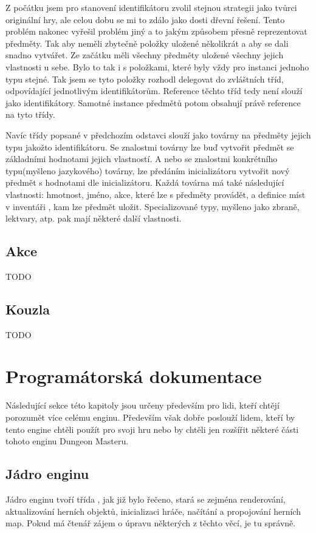Z počátku jsem pro stanovení identifikátoru zvolil stejnou strategii jako tvůrci originální hry, ale celou dobu se mi 
to zdálo jako dosti dřevní řešení. Tento problém nakonec vyřešil problém jiný a to jakým způsobem přesně reprezentovat předměty. Tak aby neměli zbytečně
položky uložené několikrát a aby se dali snadno vytvářet. Ze začátku měli všechny předměty uložené 
všechny jejich vlastnosti u sebe. Bylo to tak i s položkami, které byly vždy pro instanci jednoho typu stejné. Tak jsem se
tyto položky rozhodl delegovat do zvláštních tříd, odpovídající jednotlivým identifikátorům. Reference těchto tříd
tedy není slouží jako identifikátory. Samotné instance předmětů potom obsahují právě reference na tyto třídy.

Navíc třídy popsané v předchozím odstavci slouží jako továrny na předměty jejich typu jakožto identifikátoru. Se znalostmi továrny lze buď
vytvořit předmět se základními hodnotami jejich vlastností. A nebo se znalostmi konkrétního typu(myšleno jazykového) továrny, lze předáním inicializátoru vytvořit nový předmět 
s hodnotami dle inicializátoru. Každá továrna má také následující vlastnosti: hmotnost, jméno, akce, které lze s předměty provádět, a definice míst v inventáři
, kam lze předmět uložit. Specializované typy, myšleno jako zbraně, lektvary, atp. pak mají některé další vlastnosti.

\section{Akce}
TODO

\section{Kouzla}
TODO

\chapter{Programátorská dokumentace}
Následující sekce této kapitoly jsou určeny především pro lidi, kteří chtějí porozumět více celému enginu. Především
však dobře poslouží lidem, kteří by tento engine chtěli použít pro svoji hru nebo by chtěli jen rozšířit některé části
tohoto enginu Dungeon Masteru.

\section{Jádro enginu}
Jádro enginu tvoří třída , jak již bylo řečeno, stará se zejména renderování, aktualizování herních objektů,
inicializaci hráče, načítání a propojování herních map. Pokud má čtenář zájem o úpravu některých z těchto věcí, je tu správně.

